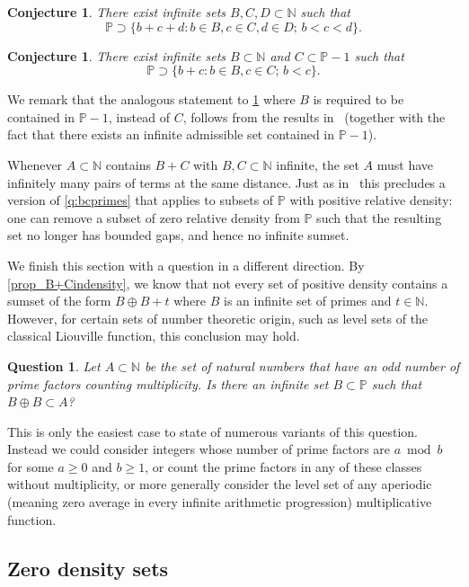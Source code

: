 \documentclass[10pt,dvipsnames]{article}
\newtheorem{conjecture}[theorem]{Conjecture}
\newtheorem{question}[theorem]{Question}
\theoremstyle{definition}
\theoremstyle{plain}
\renewcommand{\P}{\mathbb{P}}
\newcommand{\N}{\mathbb{N}}
\begin{document}
\begin{conjecture}\label{conjecture_orderedprimesBCD}
    There exist infinite sets $B,C,D\subset\N$ such that 
    $$\P\supset \big\{b+c+d:b\in B,c\in C, d\in D;\, b<c<d \big\}.$$
\end{conjecture}

\begin{conjecture}\label{conjecture_orderedprimesCBC}
    There exist infinite sets $B\subset\N$ and $C\subset\P-1$ such that 
    $$\P\supset \big\{b+c:b\in B,c\in C;\, b<c\big\}.$$
\end{conjecture}
We remark that the analogous statement to \cref{conjecture_orderedprimesCBC} where $B$ is required to be contained in $\P-1$, instead of $C$, follows from the results in~\cite{TZ23} (together with the fact that there exists an infinite admissible set contained in $\P-1$).





Whenever $A\subset\N$ contains $B+C$ with $B,C \subset \N$ infinite, the set $A$ must have infinitely many pairs of terms at the same distance.
Just as in~\cite[Remark~1.4]{TZ23} this precludes a version of \cref{q:bcprimes} that applies to subsets of $\P$ with positive relative density: one can remove a subset of zero relative density from $\P$ such that the resulting set no longer has bounded gaps, and hence no infinite sumset.


We finish this section with a question in a different direction. 
By \cref{prop_B+Cindensity}, we know that not every set of positive density contains a sumset of the form $B\oplus B+t$ where $B$ is an infinite set of primes and $t\in\N$.
However, for certain sets of number theoretic origin, such as level sets of the classical Liouville function, this conclusion may hold. 
\begin{question}
Let $A\subset\N$ be the set of natural numbers that have an odd number of prime factors counting multiplicity.
Is there an infinite set $B\subset\P$ such that $B\oplus B\subset A$?
\end{question}
This is only the easiest case to state of numerous variants of this question.  
Instead we could consider integers whose number of prime factors are $a\bmod b$ for some $a\geq 0$ and $b\geq 1$, or count the prime factors in any of these classes without multiplicity, or more generally consider the level set of any aperiodic (meaning zero average in every infinite arithmetic progression) multiplicative function.

\subsection{Zero density sets}
\label{sec:general-zero-density}
\end{document}

